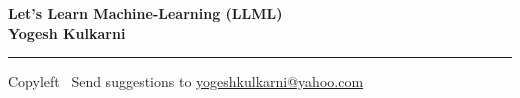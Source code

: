 
\graphicspath{{images/}}

\footnotesize


\begin{center}
\Large{\textbf{Let's Learn Machine-Learning (LLML)\\ Yogesh Kulkarni}}  
\end{center}

\begin{multicols}{2}

\end{multicols}

\rule{\linewidth}{0.25pt}
\scriptsize
Copyleft \textcopyleft\  Send suggestions to 
\href{http://www.yogeshkulkarni.com}{yogeshkulkarni@yahoo.com}



